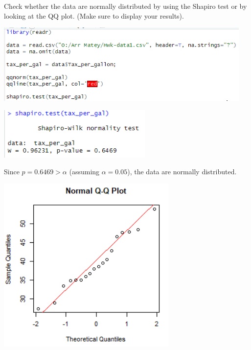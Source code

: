 Check whether the data are normally distributed by using the Shapiro test or by looking at the QQ
plot. (Make sure to display your results).

\noindent \includegraphics[width=5in]{r_2a-1.PNG}

\noindent \includegraphics[width=3in]{r_2a-3.PNG}

\noindent Since $p = 0.6469 > \alpha$ (assuming $\alpha = 0.05$), the data are normally distributed.

\noindent \includegraphics[width=3.5in]{r_2a-2.PNG}